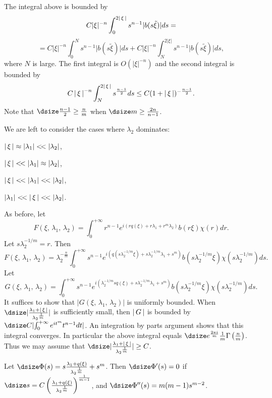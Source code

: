 The integral above is bounded by 
$$
C\vert\xi\vert^{-n}\int_{0}^{2\left\vert\,{\xi}\,\right\vert}
s^{n-1}\vert{b(s\tilde\xi)}\vert ds = 
$$
$$
= C\vert\xi\vert^{-n}\int_{0}^{N}
s^{n-1}\vert{b(s \tilde\xi)}\vert ds + C\vert\xi\vert^{-n}\int_{N}^{2\vert\xi\vert}
s^{n-1}\vert{b(s \tilde\xi)}\vert ds,
$$
where $N$ is large. The first integral is $O(\vert\xi\vert^{-n})$ and the second 
integral is bounded by 
$$ 
C\left\vert\,{\xi}\,\right\vert^{-n}\int_{N}^{2\left\vert\,{\xi}\,\right\vert}
s^{\frac{n-1}{2}}ds  \leq C(1+\left\vert\,{\xi}\,\right\vert)^{-\frac{n-1}{2}} .
$$ 
Note that $\dsize \frac{n-1}{2}\ge \frac{n}{m} $ \quad when 
$\dsize m\ge \frac{2n}{n-1}$.
\par
We are left to consider the  cases where $\lambda_2$ dominates: 
\roster
\item $ \left\vert\,{\xi}\,\right\vert\approx\vert{\lambda_1}\vert<\!< \vert{\lambda_2}\vert$,
\item $ \left\vert\,{\xi}\,\right\vert<\!<\vert{\lambda_1}\vert\approx\vert{\lambda_2}\vert$,
\item $ \left\vert\,{\xi}\,\right\vert<\!<\vert{\lambda_1}\vert<\!<\vert{\lambda_2}\vert$,
\item $ \vert{\lambda_1}\vert<\!<\left\vert\,{\xi}\,\right\vert<\!<\vert\lambda_2\vert$.
\endroster
\par
As before, let
$$
F(\xi,\,\lambda_1,\,\lambda_2) =
\int_{0}^{+\infty}r^{n-1}
e^{i( rq(\xi)+r\lambda_1+r^m\lambda_2)}b(r\xi)\chi(r)dr.
$$ 
Let $s\lambda_2^{-1/m}=r$. Then  
$$
F(\xi,\,\lambda_1,\,\lambda_2) = \lambda_2^{-\frac{n}{m}}
 \int_{0}^{+\infty}s^{n-1}
e^{i (q(s\lambda_2^{-1/m}\xi)+s\lambda_2^{-1/m}\lambda_1+s^m)}
b(s\lambda_2^{-1/m}\xi)\chi(s\lambda_2^{-1/m})ds .
$$
Let 
$$
G(\xi,\,\lambda_1,\,\lambda_2) = 
 \int_{0}^{+\infty}s^{n-1}
e^{i (\lambda_2^{-1/m}sq(\xi)+s\lambda_2^{-1/m}\lambda_1+s^m)}
b(s\lambda_2^{-1/m}\xi)\chi(s\lambda_2^{-1/m})ds .
$$
It suffices to show that $\vert{G(\xi,\,\lambda_1,\,\lambda_2)}\vert$ is uniformly
bounded. When 
 $\dsize \vert\frac{\lambda_1+\n\xi}{{\lambda_2}^{\frac{1}{m}}}\vert $ is sufficiently small, 
then $\left\vert\,{G}\,\right\vert$ is  bounded by $\dsize C\vert{\int_{0}^{+\infty}e^{i t^m}t^{n-1} dt}\vert$.
An integration by parts argument shows that this integral converges. 
In particular  the above integral
equals 
$\dsize e^{\frac{2 \pi i }{m} }\frac{1}{m}\Gamma\left(\frac{n}{m}\right)$. 
Thus we may assume that $\dsize \vert\frac{\lambda_1+\n\xi}{{\lambda_2}^{\frac{1}{m}}}\vert \ge C$.
\par
 Let $\dsize \Phi(s)= s\frac{\lambda_1+q(\xi)}{{\lambda_2}^{\frac{1}{m}} }+s^m$. Then $\dsize \Phi'(s) =0 $ if 
$\dsize s = C\left(\frac{\lambda_1+q(\xi)}{{\lambda_2}^{\frac{1}{m}} }\right)^{\frac{1}{m-1}}$, 
and  $\dsize \Phi''(s) = m(m-1)s^{m-2}$.
\par
